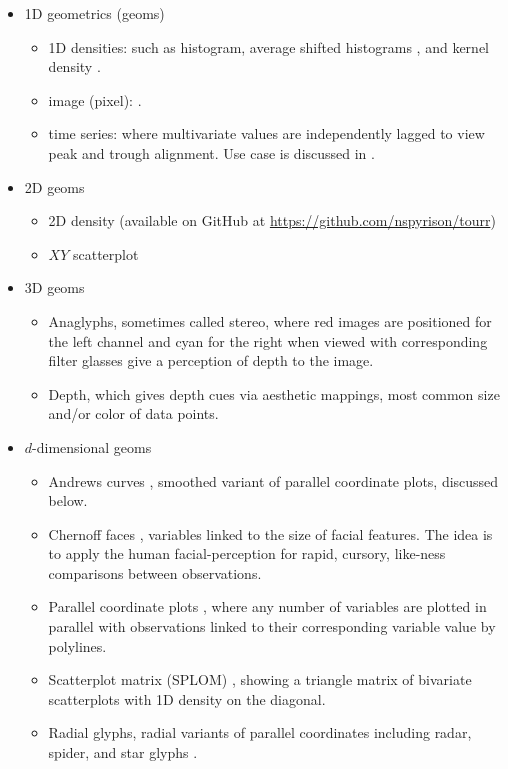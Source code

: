 \documentclass{monashthesis}
\begin{document}
\begin{itemize}
\tightlist
\item
  1D geometrics (geoms)

  \begin{itemize}
  \tightlist
  \item
    1D densities: such as histogram, average shifted histograms
    \autocite{scott_averaged_1985}, and kernel density
    \autocite{scott_incorporating_1995}.
  \item
    image (pixel): \autocite{wegman_pixel_2001}.
  \item
    time series: where multivariate values are independently lagged to
    view peak and trough alignment. Use case is discussed in
    \autocite{cook_manual_1997}.
  \end{itemize}
\item
  2D geoms

  \begin{itemize}
  \tightlist
  \item
    2D density (available on GitHub at
    \url{https://github.com/nspyrison/tourr})
  \item
    \(XY\) scatterplot
  \end{itemize}
\item
  3D geoms

  \begin{itemize}
  \tightlist
  \item
    Anaglyphs, sometimes called stereo, where red images are positioned
    for the left channel and cyan for the right when viewed with
    corresponding filter glasses give a perception of depth to the
    image.
  \item
    Depth, which gives depth cues via aesthetic mappings, most common
    size and/or color of data points.
  \end{itemize}
\item
  \(d\)-dimensional geoms

  \begin{itemize}
  \tightlist
  \item
    Andrews curves \autocite{andrews_plots_1972}, smoothed variant of
    parallel coordinate plots, discussed below.
  \item
    Chernoff faces \autocite{chernoff_use_1973}, variables linked to the
    size of facial features. The idea is to apply the human
    facial-perception for rapid, cursory, like-ness comparisons between
    observations.
  \item
    Parallel coordinate plots \autocite{ocagne_coordonnees_1885}, where
    any number of variables are plotted in parallel with observations
    linked to their corresponding variable value by polylines.
  \item
    Scatterplot matrix (SPLOM) \autocite{becker_brushing_1987}, showing
    a triangle matrix of bivariate scatterplots with 1D density on the
    diagonal.
  \item
    Radial glyphs, radial variants of parallel coordinates including
    radar, spider, and star glyphs \autocite{siegel_surgical_1972}.
  \end{itemize}
\end{itemize}
\end{document}
